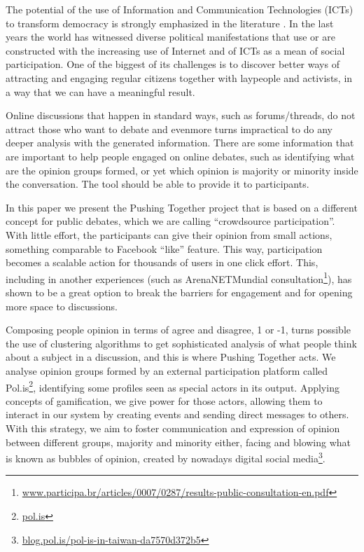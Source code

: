 \documentclass{llncs}
\begin{document}
  The potential of the use of Information and Communication Technologies (ICTs)
to transform democracy is strongly emphasized in the literature
\cite{benkler} \cite{castells} \cite{levy}. In the last years the world has
witnessed diverse political manifestations that use or are constructed with
the increasing use of Internet and of ICTs as a mean of social participation.
One of the biggest of its challenges is to discover better ways of attracting
and engaging regular citizens together with laypeople and activists, in a way
that we can have a meaningful result.

  Online discussions that happen in standard ways, such as forums/threads, do
not attract those who want to debate and evenmore turns
impractical to do any deeper analysis with the generated information. There are
some information that are important to help people engaged on online debates,
such as identifying what are the opinion groups formed, or yet which opinion is
majority or minority inside the conversation. The tool should be able to provide
it to participants.

  In this paper we present the Pushing Together project that is based on a
different concept for public debates, which we are calling ``crowdsource
participation''. With little effort, the participants can give their
opinion from small actions, something comparable to Facebook ``like'' feature.
This way, participation becomes a scalable action for thousands of users in
one click effort. This, including in another experiences (such as ArenaNETMundial
consultation\footnote{\url{www.participa.br/articles/0007/0287/results-public-consultation-en.pdf}}),
has shown to be a great option to break
the barriers for engagement and for opening more space to discussions.

  Composing people opinion in terms of agree and disagree, 1 or -1, turns
possible the use of clustering algorithms to get sophisticated analysis of what
people think about a subject in a discussion, and this is where Pushing
Together acts. We analyse opinion groups formed by an external participation
platform called Pol.is\footnote{\url{pol.is}},
identifying some profiles seen as special actors in its output.
Applying concepts of gamification, we give power for those
actors, allowing them to interact in our system by creating events and
sending direct messages to others. With this strategy, we aim to foster
communication and expression of opinion between different groups, majority and
minority either, facing and blowing what is known as
bubbles of opinion, created by nowadays digital
social media\footnote{\url{blog.pol.is/pol-is-in-taiwan-da7570d372b5}}.
\end{document}

